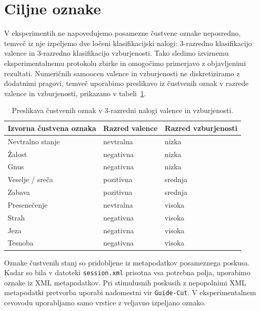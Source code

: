 \section{Ciljne oznake}
\label{subsec:ciljne-oznake}

V eksperimentih ne napovedujemo posamezne čustvene oznake neposredno, temveč iz nje izpeljemo dve ločeni klasifikacijski nalogi: 3-razredno klasifikacijo valence in 3-razredno klasifikacijo vzburjenosti.
Tako sledimo izvirnemu eksperimentalnemu protokolu zbirke \MAHNOB{} in omogočimo primerjavo z objavljenimi rezultati.
Numeričnih samoocen valence in vzburjenosti ne diskretiziramo z dodatnimi pragovi, temveč uporabimo preslikavo iz čustvenih oznak v razrede valence in vzburjenosti, prikazano v tabeli~\ref{tab:label-mapping}.

\begin{table}[t]
    \centering
    \caption{Preslikava čustvenih oznak v 3-razredni nalogi valence in vzburjenosti.}
    \label{tab:label-mapping}
    \small
    \begin{tabularx}{\textwidth}{@{}>{\raggedright\arraybackslash}p{} >{\raggedright\arraybackslash}X >{\raggedright\arraybackslash}X@{}}
        \toprule
        Izvorna čustvena oznaka & Razred valence & Razred vzburjenosti \\
        \midrule
        Nevtralno stanje & nevtralna & nizka \\
        Žalost & negativna & nizka \\
        Gnus & negativna & nizka \\
        Veselje / sreča & pozitivna & srednja \\
        Zabava & pozitivna & srednja \\
        Presenečenje & nevtralna & visoka \\
        Strah & negativna & visoka \\
        Jeza & negativna & visoka \\
        Tesnoba & negativna & visoka \\
        \bottomrule
    \end{tabularx}
\end{table}

Oznake čustvenih stanj so pridobljene iz metapodatkov posameznega poskusa.
Kadar so bila v datoteki \texttt{session.xml} prisotna vsa potrebna polja, uporabimo oznake iz XML metapodatkov.
Pri stimulusnih poskusih z nepopolnimi XML metapodatki pretvorba uporabi nadomestni vir \texttt{Guide-Cut}.
V eksperimentalnem cevovodu uporabljamo samo vrstice z veljavno izpeljano oznako.

